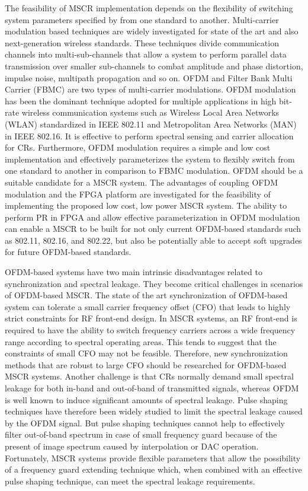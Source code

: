 The feasibility of MSCR implementation depends on the flexibility of switching system parameters specified by from one standard to another.
Multi-carrier modulation based techniques are widely investigated for state of the art and also next-generation wireless standards.
These techniques divide communication channels into multi-sub-channels that allow a system to perform parallel data transmission over smaller sub-channels to combat amplitude and phase distortion, impulse noise, multipath propagation and so on.
OFDM and Filter Bank Multi Carrier (FBMC) are two types of multi-carrier modulations.
OFDM modulation has been the dominant technique adopted for multiple applications in high bit-rate wireless communication systems such as Wireless Local Area Networks (WLAN) standardized in IEEE 802.11 and Metropolitan Area Networks (MAN) in IEEE 802.16.
It is effective to perform spectral sensing and carrier allocation for CRs.
Furthermore, OFDM modulation requires a simple and low cost implementation and effectively parameterizes the system to flexibly switch from one standard to another in comparison to FBMC modulation.
OFDM should be a suitable candidate for a MSCR system.
The advantages of coupling OFDM modulation and the FPGA platform are investigated for the feasibility of implementing the proposed low cost, low power MSCR system.
The ability to perform PR in FPGA and allow effective parameterization in OFDM modulation can enable a MSCR to be built for not only current OFDM-based standards such as 802.11, 802.16, and 802.22, but also be potentially able to accept soft upgrades for future OFDM-based standards.

OFDM-based systems have two main intrinsic disadvantages related to synchronization and spectral leakage. They become critical challenges in scenarios of OFDM-based MSCR.
The state of the art synchronization of OFDM-based system can tolerate a small carrier frequency offset (CFO) that leads to highly strict constraints for RF front-end design.
In MSCR systems, an RF front-end is required to have the ability to switch frequency carriers across a wide frequency range according to spectral operating areas.  This tends to suggest that the constraints of small CFO may not be feasible.
Therefore, new synchronization methods that are robust to large CFO should be researched for OFDM-based MSCR systems.
Another challenge is that CRs normally demand small spectral leakage for both in-band and out-of-band of transmitted signals, whereas OFDM is well known to induce significant amounts of spectral leakage.
Pulse shaping techniques have therefore been widely studied to limit the spectral leakage caused by the OFDM signal.
But pulse shaping techniques cannot help to effectively filter out-of-band spectrum in case of small frequency guard because of the present of image spectrum caused by interpolation or DAC operation.
Fortunately, MSCR systems provide flexible parameters that allow the possibility of a frequency guard extending technique which, when combined with an effective pulse shaping technique, can meet the spectral leakage requirements.

